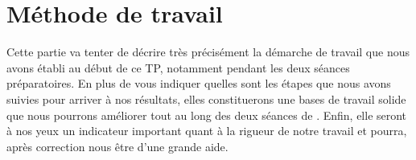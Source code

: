 \section{Méthode de travail}
Cette partie va tenter de décrire très précisément la démarche de travail que nous avons établi au début de ce TP, notamment pendant les deux séances préparatoires. En plus de vous indiquer quelles sont les étapes que nous avons suivies pour arriver à nos résultats, elles constituerons une bases de travail solide que nous pourrons améliorer tout au long des deux séances de . Enfin, elle seront à nos yeux un indicateur important quant à la rigueur de notre travail et pourra, après correction nous être d'une grande aide.



